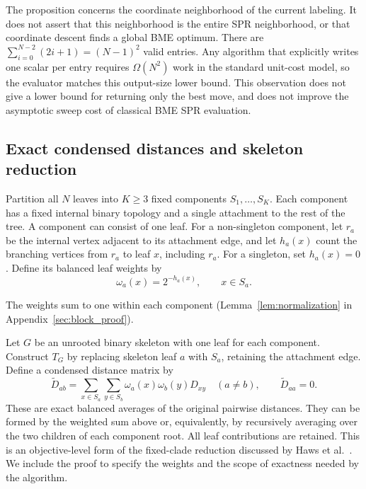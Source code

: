 \documentclass[11pt,a4paper]{article}
\makeatletter
\DeclareRobustCommand{\_}{\ifmmode\nfss@text{\textunderscore}\else\textunderscore\allowbreak\fi}
\theoremstyle{definition}
\makeatother
\begin{document}
The proposition concerns the coordinate neighborhood of the current labeling.
It does not assert that this neighborhood is the entire SPR neighborhood, or that coordinate descent finds a global BME optimum.
There are $\sum_{i=0}^{N-2}(2i+1)=(N-1)^2$ valid entries.
Any algorithm that explicitly writes one scalar per entry requires $\Omega(N^2)$ work in the standard unit-cost model, so the evaluator matches this output-size lower bound.
This observation does not give a lower bound for returning only the best move, and does not improve the asymptotic sweep cost of classical BME SPR evaluation.

\subsection{Exact condensed distances and skeleton reduction}
\label{sec:condensation}

Partition all $N$ leaves into $K\geq3$ fixed components $S_1,\ldots,S_K$.
Each component has a fixed internal binary topology and a single attachment to the rest of the tree.
A component can consist of one leaf.
For a non-singleton component, let $r_a$ be the internal vertex adjacent to its attachment edge, and let $h_a(x)$ count the branching vertices from $r_a$ to leaf $x$, including $r_a$.
For a singleton, set $h_a(x)=0$.
Define its balanced leaf weights by
\begin{equation}
 \omega_a(x)=2^{-h_a(x)},\qquad x\in S_a.
 \label{eq:profile}
\end{equation}

The weights sum to one within each component (Lemma~\ref{lem:normalization} in Appendix~\ref{sec:block_proof}).

Let $G$ be an unrooted binary skeleton with one leaf for each component.
Construct $T_G$ by replacing skeleton leaf $a$ with $S_a$, retaining the attachment edge.
Define a condensed distance matrix by
\begin{equation}
 \widetilde D_{ab}
 =\sum_{x\in S_a}\sum_{y\in S_b}
    \omega_a(x)\omega_b(y)D_{xy}\quad(a\ne b),
 \qquad \widetilde D_{aa}=0.
 \label{eq:condensed_D}
\end{equation}
These are exact balanced averages of the original pairwise distances.
They can be formed by the weighted sum above or, equivalently, by recursively averaging over the two children of each component root.
All leaf contributions are retained.
This is an objective-level form of the fixed-clade reduction discussed by Haws et al.~\cite[Section~2.4]{haws2011optimality}.
We include the proof to specify the weights and the scope of exactness needed by the algorithm.
\end{document}
